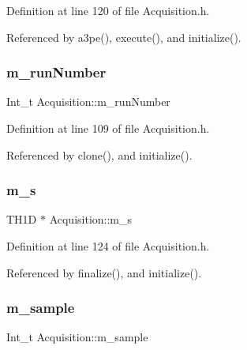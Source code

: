 Definition at line 120 of file Acquisition.\+h.



Referenced by a3pe(), execute(), and initialize().

\mbox{\label{classAcquisition_afd35e220e0bfda7e763584524273aeb0}} 
\subsubsection{\texorpdfstring{m\+\_\+run\+Number}{m\_runNumber}}
{\footnotesize\ttfamily Int\+\_\+t Acquisition\+::m\+\_\+run\+Number\hspace{0.3cm}{\ttfamily [private]}}



Definition at line 109 of file Acquisition.\+h.



Referenced by clone(), and initialize().

\mbox{\label{classAcquisition_ad7f531c3d3fc58d1a2a5eab954db0ca7}} 
\subsubsection{\texorpdfstring{m\+\_\+s}{m\_s}}
{\footnotesize\ttfamily T\+H1D $\ast$ Acquisition\+::m\+\_\+s\hspace{0.3cm}{\ttfamily [private]}}



Definition at line 124 of file Acquisition.\+h.



Referenced by finalize(), and initialize().

\mbox{\label{classAcquisition_a154e5423720ab1f2c4ab5cd125cb4e80}} 
\subsubsection{\texorpdfstring{m\+\_\+sample}{m\_sample}}
{\footnotesize\ttfamily Int\+\_\+t Acquisition\+::m\+\_\+sample\hspace{0.3cm}{\ttfamily [private]}}



